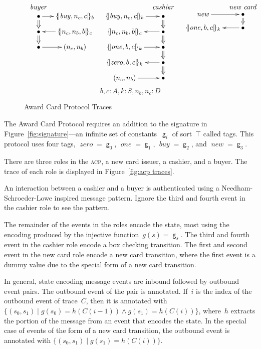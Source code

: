 \documentclass[titlepage,12pt]{article}
\newcommand{\acp}{\textsc{acp}}
\newcommand{\cn}[1]{\ensuremath{\operatorname{\mathsf{#1}}}}
\newcommand{\fn}[1]{\ensuremath{\operatorname{\mathit{#1}}}}
\newcommand{\typ}{\mathbin:}
\newcommand{\enc}[2]{\ensuremath{\{\!|#1|\!\}_{#2}}}
\begin{document}
\begin{figure}
$$\begin{array}{rll}
\xymatrix@=.6em{\raisebox{-1ex}[0ex][0ex]{\strut\fn{buyer}}\\
  \bullet\ar@{=>}[d]\ar[r]&\enc{\mathit{buy},n_c,c}{b}\\
  \bullet\ar@{=>}[d]&\enc{n_c,n_b,b}{c}\ar[l]\\
  \bullet\ar[r]&(n_c,n_b)}&
\xymatrix@=.6em{&\raisebox{-1ex}[0ex][0ex]{\strut\fn{cashier}}\\
\enc{\mathit{buy},n_c,c}{b}\ar[r]&\bullet\ar@{=>}[d]\\
\enc{n_c,n_b,b}{c}&\bullet\ar@{=>}[d]\ar[l]\\
\enc{\mathit{one},b,c}{k}\ar[r]&\bullet\ar@{=>}[d]\\
\enc{\mathit{zero},b,c}{k}&\bullet\ar@{=>}[d]\ar[l]\\
(n_c,n_b)\ar[r]&\bullet}&
\xymatrix@=.6em{&\raisebox{-1ex}[0ex][0ex]{\strut\fn{new\ card}}\\
\fn{new}\ar[r]&\bullet\ar@{=>}[d]\\
\enc{\mathit{one},b,c}{k}&\bullet\ar[l]}
\end{array}$$
$$b,c\typ A, k\typ S, n_b,n_c\typ D$$
\caption{Award Card Protocol Traces}\label{fig:acp traces}
\end{figure}

The Award Card Protocol requires an addition to the signature in
Figure~\ref{fig:signature}---an infinite set of constants~$\cn{g}_i$
of sort~$\top$ called tags.  This protocol uses four tags,
$\fn{zero}=\cn{g}_0$, $\fn{one}=\cn{g}_1$, $\fn{buy}=\cn{g}_2$, and
$\fn{new}=\cn{g}_3$.

There are three roles in the {\acp}, a new card issuer, a cashier, and
a buyer.  The trace of each role is displayed in Figure~\ref{fig:acp
  traces}.

An interaction between a cashier and a buyer is authenticated using a
Needham-Schroeder-Lowe inspired message pattern.  Ignore the third and
fourth event in the cashier role to see the pattern.

The remainder of the events in the roles encode the state, most using
the encoding produced by the injective function~$g(s)=\cn{g}_s$.  The
third and fourth event in the cashier role encode a box checking
transition.  The first and second event in the new card role encode a
new card transition, where the first event is a dummy value due to the
special form of a new card transition.

In general, state encoding message events are inbound followed by
outbound event pairs.  The outbound event of the pair is annotated.
If~$i$ is the index of the outbound event of trace~$C$, then it is
annotated with $\{(s_0,s_1)\mid g(s_0)=h(C(i-1))\land
g(s_1)=h(C(i))\}$, where~$h$ extracts the portion of the message from
an event that encodes the state.  In the special case of events of the
form of a new card transition, the outbound event is annotated with
$\{(s_0,s_1)\mid g(s_1)=h(C(i))\}$.
\end{document}
